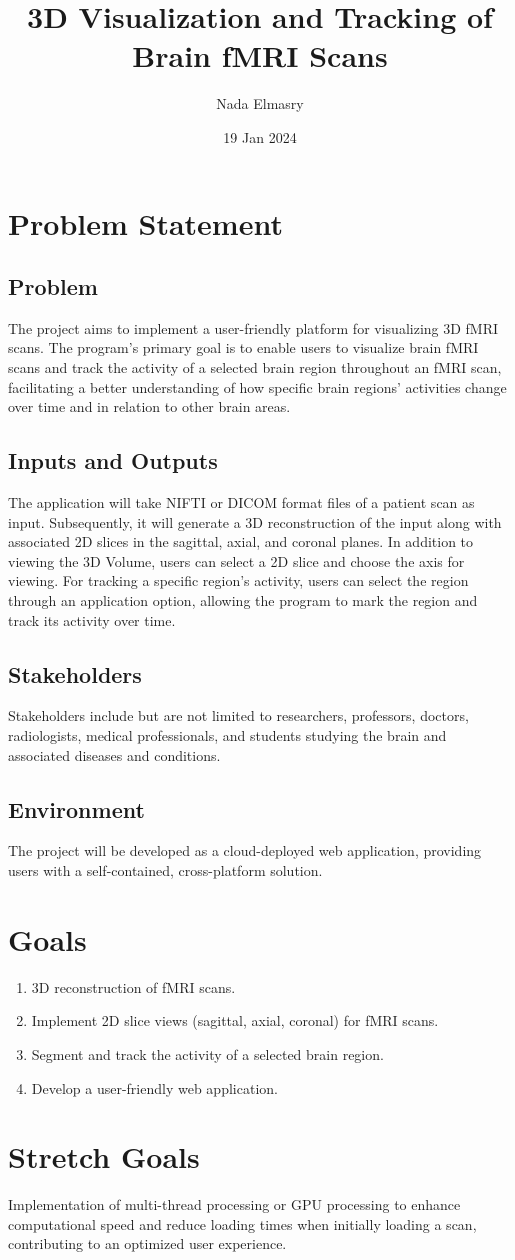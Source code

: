 \documentclass{article}
\title{3D Visualization and Tracking of Brain fMRI Scans\\\progname}
\author{Nada Elmasry\authname}
\date{19 Jan 2024}
\begin{document}
\maketitle

\section{Problem Statement}
 
\subsection{Problem}
The project aims to implement a user-friendly platform for visualizing 3D fMRI scans.
The program's primary goal is to enable users to visualize brain fMRI scans and track
the activity of a selected brain region throughout an fMRI scan, facilitating a better
understanding of how specific brain regions' activities change over time and in relation to other brain areas.

\subsection{Inputs and Outputs}
The application will take NIFTI or DICOM format files of a patient scan as input.
Subsequently, it will generate a 3D reconstruction of the input along with associated
2D slices in the sagittal, axial, and coronal planes. In addition to viewing the 3D Volume,
users can select a 2D slice and choose the axis for viewing. For tracking a specific region's
activity, users can select the region through an application option, allowing the program to mark the region 
and track its activity over time.



\subsection{Stakeholders}
Stakeholders include but are not limited to researchers, professors, doctors, 
radiologists, medical professionals, and students studying the brain and associated 
diseases and conditions.


\subsection{Environment}
The project will be developed as a cloud-deployed web application, providing users
with a self-contained, cross-platform solution.

\section{Goals}
\begin{enumerate}
\item 3D reconstruction of fMRI scans.
\item Implement 2D slice views (sagittal, axial, coronal) for fMRI scans.
\item Segment and track the activity of a selected brain region.
\item Develop a user-friendly web application.
\end{enumerate}

\section{Stretch Goals}
Implementation of multi-thread processing or GPU processing to enhance computational 
speed and reduce loading times when initially loading a scan, contributing to an optimized user experience.
\end{document}
